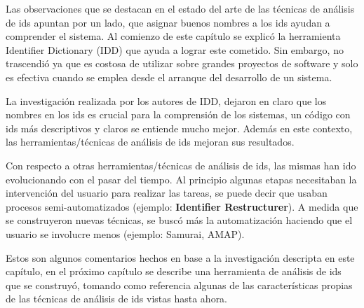 Las observaciones que se destacan en el estado del arte de las técnicas de análisis de ids apuntan por un lado, que asignar buenos nombres a los ids ayudan a comprender el sistema. Al comienzo de este capítulo se explicó la herramienta Identifier Dictionary (IDD) que ayuda a lograr este cometido. Sin embargo, no trascendió ya que es costosa de utilizar sobre grandes proyectos de software y solo es efectiva cuando se emplea desde el arranque del desarrollo de un sistema.

La investigación realizada por los autores de IDD, dejaron en claro que los nombres en los ids es crucial para la comprensión de los sistemas, un código con ids más descriptivos y claros se entiende mucho mejor. Además en este contexto, las herramientas/técnicas de análisis de ids mejoran sus resultados. 

Con respecto a otras herramientas/técnicas de análisis de ids, las mismas han ido evolucionando con el pasar del tiempo. Al principio algunas etapas necesitaban la intervención del usuario para realizar las tareas, se puede decir que usaban procesos semi-automatizados (ejemplo: \textbf{Identifier Restructurer}). A medida que se construyeron nuevas técnicas, se buscó más la automatización haciendo que el usuario se involucre menos (ejemplo: Samurai, AMAP). 

Estos son algunos comentarios hechos en base a la investigación descripta en este capítulo, en el próximo capítulo se describe una herramienta de análisis de ids que se construyó, tomando como referencia algunas de las características propias de las técnicas de análisis de ids vistas hasta ahora.




